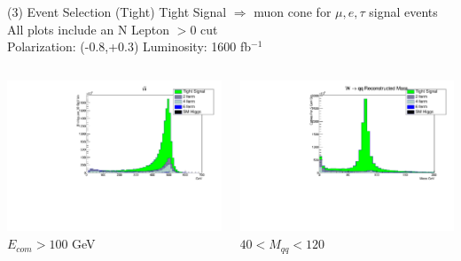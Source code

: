 \documentclass[10pt]{beamer}
\begin{document}
\begin{frame}{(3) Event Selection (Tight)}
\scriptsize
Tight Signal $\Rightarrow$  muon cone for $\mu,e,\tau$ signal events\\
All plots include an N Lepton $> 0$ cut\\
Polarization: (-0.8,+0.3)\quad
Luminosity: 1600 fb$^{-1}$
\begin{columns}
\begin{column}{0.5\textwidth}
\includegraphics[scale=0.3, left]{EcomHist.pdf} \\
$E_{com} > 100$ GeV
\end{column}
\begin{column}{0.5\textwidth}
\includegraphics[scale=0.3, left]{mwhadHist.pdf} \\
$ 40 < M_{qq} < 120$
\end{column}
\end{columns}
\end{frame}
\end{document}
